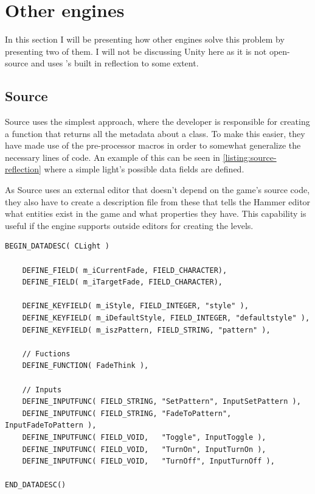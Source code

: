 \section{Other engines}

In this section I will be presenting how other engines solve this problem by presenting two of them. I will not be discussing Unity here as it is not open-source and uses \Csh 's built in reflection to some extent.

\subsection{Source}
Source uses the simplest approach, where the developer is responsible for creating a function that returns all the metadata about a class.
To make this easier, they have made use of the pre-processor macros in order to somewhat generalize the necessary lines of code. An example of this can be seen in \autoref{listing:source-reflection} where a simple light's possible data fields are defined.

As Source uses an external editor that doesn't depend on the game's source code, they also have to create a description file from these that tells the Hammer editor what entities exist in the game and what properties they have.
This capability is useful if the engine supports outside editors for creating the levels.

\begin{listing}
    \begin{verbatim}
BEGIN_DATADESC( CLight )

	DEFINE_FIELD( m_iCurrentFade, FIELD_CHARACTER),
	DEFINE_FIELD( m_iTargetFade, FIELD_CHARACTER),

	DEFINE_KEYFIELD( m_iStyle, FIELD_INTEGER, "style" ),
	DEFINE_KEYFIELD( m_iDefaultStyle, FIELD_INTEGER, "defaultstyle" ),
	DEFINE_KEYFIELD( m_iszPattern, FIELD_STRING, "pattern" ),

	// Fuctions
	DEFINE_FUNCTION( FadeThink ),

	// Inputs
	DEFINE_INPUTFUNC( FIELD_STRING, "SetPattern", InputSetPattern ),
	DEFINE_INPUTFUNC( FIELD_STRING, "FadeToPattern", InputFadeToPattern ),
	DEFINE_INPUTFUNC( FIELD_VOID,	"Toggle", InputToggle ),
	DEFINE_INPUTFUNC( FIELD_VOID,	"TurnOn", InputTurnOn ),
	DEFINE_INPUTFUNC( FIELD_VOID,	"TurnOff", InputTurnOff ),

END_DATADESC()
    \end{verbatim}
    \caption{Example of the reflection code in Source for a light entity}
    \label{listing:source-reflection}
\end{listing}


